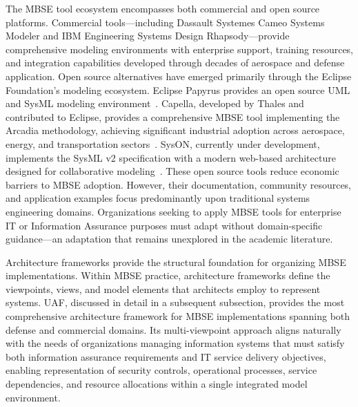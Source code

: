 The MBSE tool ecosystem encompasses both commercial and open source platforms. Commercial tools---including Dassault Systemes Cameo Systems Modeler and IBM Engineering Systems Design Rhapsody---provide comprehensive modeling environments with enterprise support, training resources, and integration capabilities developed through decades of aerospace and defense application. Open source alternatives have emerged primarily through the Eclipse Foundation's modeling ecosystem. Eclipse Papyrus provides an open source UML and SysML modeling environment~\parencite{Eclipse_Papyrus_2024}. Capella, developed by Thales and contributed to Eclipse, provides a comprehensive MBSE tool implementing the Arcadia methodology, achieving significant industrial adoption across aerospace, energy, and transportation sectors~\parencite{Capella_MBSE_2024}. SysON, currently under development, implements the SysML v2 specification with a modern web-based architecture designed for collaborative modeling~\parencite{SysON_2025}. These open source tools reduce economic barriers to MBSE adoption. However, their documentation, community resources, and application examples focus predominantly upon traditional systems engineering domains. Organizations seeking to apply MBSE tools for enterprise IT or Information Assurance purposes must adapt without domain-specific guidance---an adaptation that remains unexplored in the academic literature.

Architecture frameworks provide the structural foundation for organizing MBSE implementations. Within MBSE practice, architecture frameworks define the viewpoints, views, and model elements that architects employ to represent systems. UAF, discussed in detail in a subsequent subsection, provides the most comprehensive architecture framework for MBSE implementations spanning both defense and commercial domains. Its multi-viewpoint approach aligns naturally with the needs of organizations managing information systems that must satisfy both information assurance requirements and IT service delivery objectives, enabling representation of security controls, operational processes, service dependencies, and resource allocations within a single integrated model environment.

